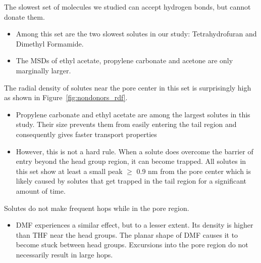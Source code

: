 \documentclass{article}
\begin{document}
  The slowest set of molecules we studied can accept hydrogen bonds, but cannot donate
  them. 
  \begin{itemize}
  	\item Among this set are the two slowest solutes in our study: Tetrahydrofuran and Dimethyl Formamide.
  	\item The MSDs of ethyl acetate, propylene carbonate and acetone are only marginally larger.
  \end{itemize}  
  
  
  \noindent The radial density of solutes near the pore center in this set is 
  surprisingly high as shown in Figure~\ref{fig:nondonors_rdf}.
  \begin{itemize}
    \item Propylene carbonate and ethyl acetate are among the largest solutes
    in this study. Their size prevents them from easily entering the tail 
    region and consequently gives faster transport properties 
    \item However, this is not a hard rule. When a solute does overcome the 
    barrier of entry beyond the head group region, it can become trapped. All
    solutes in this set show at least a small peak $\geq$ 0.9 nm from the pore 
    center which is likely caused by solutes that get trapped in the tail region
    for a significant amount of time.
  \end{itemize}
    
  \noindent Solutes do not make frequent hops while in the pore region.
  \begin{itemize}
	\item DMF experiences a similar effect, but to a lesser extent. Its density is 
	higher than THF near the head groups. The planar shape of DMF causes it to 
	become stuck between head groups. Excursions into the pore region do not
	necessarily result in large hops.
  \end{itemize}
  
\end{document}
